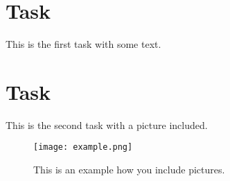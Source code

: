 \documentclass{article} %
\begin{document}
\section{Task}
This is the first task with some text.\\
\lipsum[1-2]

\section{Task}
This is the second task with a picture included.\\
\lipsum[2-3]
\begin{figure}[h]
    \centering
    \texttt{[image: example.png]}
    \caption{This is an example how you include pictures.}
    \label{fig:example}
\end{figure}
\end{document}
